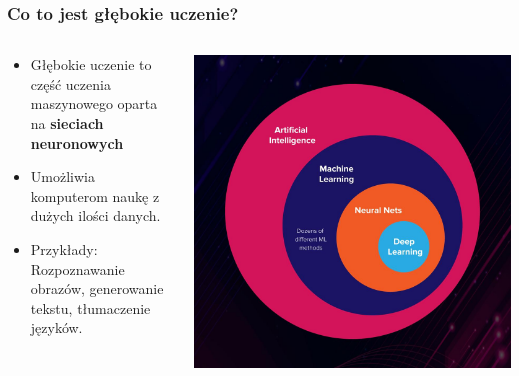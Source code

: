 \documentclass[smaller]{beamer}
\begin{document}

\begin{frame}
\frametitle{Co to jest głębokie uczenie?}

\begin{columns}
    \begin{column}{0.6\textwidth}
        \begin{itemize}
            \item Głębokie uczenie to część uczenia maszynowego oparta na \textbf{sieciach neuronowych}
            \item Umożliwia komputerom naukę z dużych ilości danych.
            \item Przykłady: Rozpoznawanie obrazów, generowanie tekstu, tłumaczenie języków.
        \end{itemize}
    \end{column}

    \begin{column}{0.4\textwidth}
        \includegraphics[width=\textwidth]{../manifest/ml-dl.jpg} %
    \end{column}
\end{columns}
\end{frame}

\end{document}
